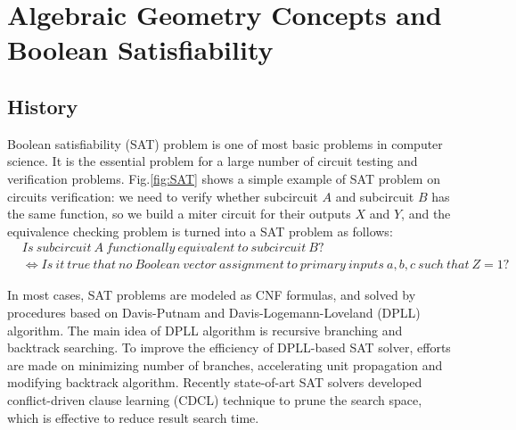\section{Algebraic Geometry Concepts and Boolean Satisfiability}
\subsection{History}
Boolean satisfiability (SAT) problem is one of most basic problems in computer science.
It is the essential problem for a large number of circuit testing and verification problems.
Fig.\ref{fig:SAT} shows a simple example of SAT problem on circuits verification:
we need to verify whether subcircuit $A$ and subcircuit $B$ has the same function, so
we build a miter circuit for their outputs $X$ and $Y$, and the equivalence checking 
problem is turned into a SAT problem as follows:
\begin{align*}
&Is\ subcircuit\ A\ functionally\ equivalent\ to\ subcircuit\ B?\\
&\Longleftrightarrow
Is\ it\ true\ that\ no\ Boolean\ vector\ assignment\ to\ primary\ inputs\ a,b,c\ such\ that\ Z=1?
\end{align*}

\begin{figure}[hbt]
\end{figure}


In most cases, SAT problems are modeled as CNF formulas, and solved by procedures based on 
Davis-Putnam and Davis-Logemann-Loveland (DPLL) algorithm. The main idea of DPLL algorithm
is recursive branching and backtrack searching. To improve the efficiency of DPLL-based
SAT solver, efforts are made on minimizing number of branches, accelerating unit propagation
and modifying backtrack algorithm. Recently state-of-art SAT solvers developed conflict-driven
clause learning (CDCL) technique to prune the search space, which is effective to reduce
result search time.

